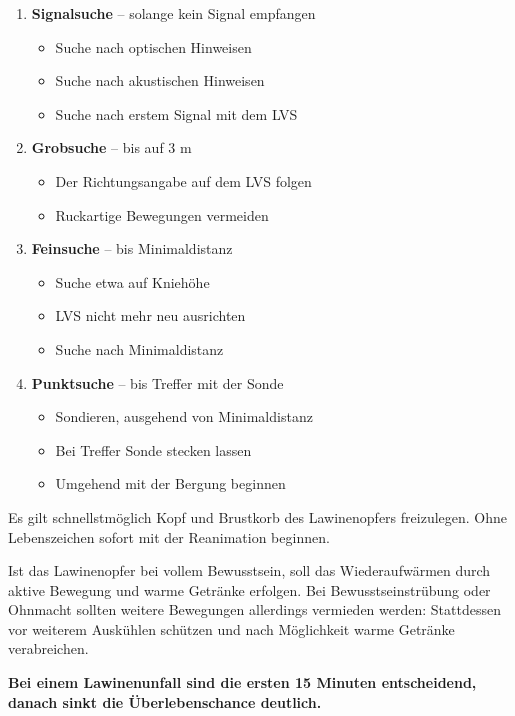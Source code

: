 \begin{enumerate}
  \item{
    \textbf{Signalsuche} -- solange kein Signal empfangen
    \begin{itemize}
      \item{Suche nach optischen Hinweisen}
      \item{Suche nach akustischen Hinweisen}
      \item{Suche nach erstem Signal mit dem LVS}
    \end{itemize}
  }
  \item{
    \textbf{Grobsuche} -- bis auf 3 m 
    \begin{itemize}
      \item{Der Richtungsangabe auf dem LVS folgen}
      \item{Ruckartige Bewegungen vermeiden}
    \end{itemize}
  }
  \item{
    \textbf{Feinsuche} -- bis Minimaldistanz
    \begin{itemize}
      \item{Suche etwa auf Kniehöhe}
      \item{LVS nicht mehr neu ausrichten}
      \item{Suche nach Minimaldistanz}
    \end{itemize}
  }
  \item{
    \textbf{Punktsuche} -- bis Treffer mit der Sonde
    \begin{itemize}
      \item{Sondieren, ausgehend von Minimaldistanz}
      \item{Bei Treffer Sonde stecken lassen}
      \item{Umgehend mit der Bergung beginnen}
    \end{itemize}
  }
\end{enumerate}

Es gilt schnellstmöglich Kopf und Brustkorb des Lawinenopfers freizulegen.
Ohne Lebenszeichen sofort mit der Reanimation beginnen.

Ist das Lawinenopfer bei vollem Bewusstsein, soll das Wiederaufwärmen durch aktive Bewegung und warme Getränke erfolgen.
Bei Bewusstseinstrübung oder Ohnmacht sollten weitere Bewegungen allerdings vermieden werden: Stattdessen vor weiterem Auskühlen schützen und nach Möglichkeit warme Getränke verabreichen.

\textbf{Bei einem Lawinenunfall sind die ersten 15 Minuten entscheidend, danach sinkt die Überlebenschance deutlich.}

